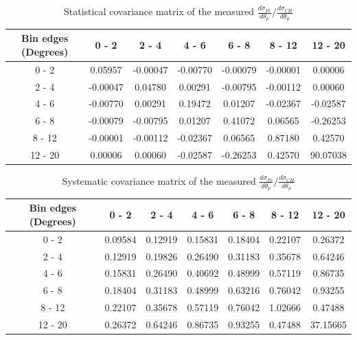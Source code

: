 \documentclass[aps,prl,twocolumn,superscriptaddress,nofootinbib]{revtex4-1}
\begin{document}
\begin{table}[h!]
  \centering
  \caption{Statistical covariance matrix of the measured $\frac{d\sigma_{Fe}}{d\theta_{\mu}}/\frac{d\sigma_{CH}}{d\theta_{\mu}}$}
    \begin{tabular}{c||cccccc}
      Bin edges (Degrees) & 0 - 2 & 2 - 4 & 4 - 6 & 6 - 8 & 8 - 12 & 12 - 20 \\
\hline \hline
        0 - 2 &  0.05957 & -0.00047 & -0.00770 & -0.00079 & -0.00001 &  0.00006 \\
        2 - 4 & -0.00047 &  0.04780 &  0.00291 & -0.00795 & -0.00112 &  0.00060 \\
        4 - 6 & -0.00770 &  0.00291 &  0.19472 &  0.01207 & -0.02367 & -0.02587 \\
        6 - 8 & -0.00079 & -0.00795 &  0.01207 &  0.41072 &  0.06565 & -0.26253 \\
       8 - 12 & -0.00001 & -0.00112 & -0.02367 &  0.06565 &  0.87180 &  0.42570 \\
      12 - 20 &  0.00006 &  0.00060 & -0.02587 & -0.26253 &  0.42570 & 90.07038 \\
    \end{tabular}
  \label{tablecov:Fe_Statistical_ThetaMu}
\end{table}

\begin{table}[h!]
  \centering
  \caption{Systematic covariance matrix of the measured $\frac{d\sigma_{Fe}}{d\theta_{\mu}}/\frac{d\sigma_{CH}}{d\theta_{\mu}}$}
    \begin{tabular}{c||cccccc}
      Bin edges (Degrees) & 0 - 2 & 2 - 4 & 4 - 6 & 6 - 8 & 8 - 12 & 12 - 20 \\
\hline \hline
        0 - 2 &  0.09584 &  0.12919 &  0.15831 &  0.18404 &  0.22107 &  0.26372 \\
        2 - 4 &  0.12919 &  0.19826 &  0.26490 &  0.31183 &  0.35678 &  0.64246 \\
        4 - 6 &  0.15831 &  0.26490 &  0.40692 &  0.48999 &  0.57119 &  0.86735 \\
        6 - 8 &  0.18404 &  0.31183 &  0.48999 &  0.63216 &  0.76042 &  0.93255 \\
       8 - 12 &  0.22107 &  0.35678 &  0.57119 &  0.76042 &  1.02666 &  0.47488 \\
      12 - 20 &  0.26372 &  0.64246 &  0.86735 &  0.93255 &  0.47488 & 37.15665 \\
    \end{tabular}
  \label{tablecov:Fe_Systematic_ThetaMu}
\end{table}
\end{document}
